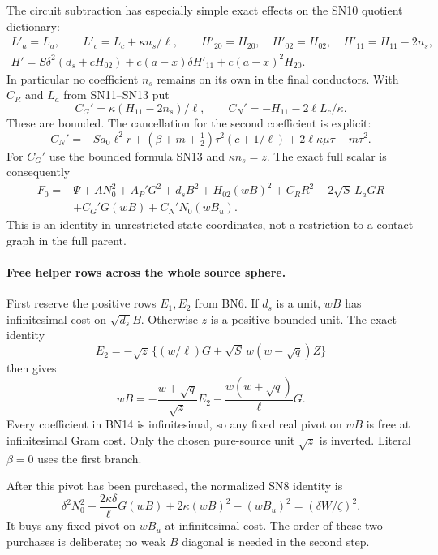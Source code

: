 The circuit subtraction has especially simple exact effects on the
SN10 quotient dictionary:
\[
\begin{gathered}
 L'_a=L_a,\qquad L'_c=L_c+\kappa n_s/\ell,\qquad
 H'_{20}=H_{20},\quad H'_{02}=H_{02},\quad
 H'_{11}=H_{11}-2n_s,\\
 H'=S\delta^2(d_s+cH_{02})
               +c(a-x)\delta H'_{11}+c(a-x)^2H_{20}.
\end{gathered}\tag{BN10}
\]
In particular no coefficient $n_s$ remains on its own in the final
conductors. With $C_R$ and $L_a$ from SN11--SN13 put
\[
 C_G'=\kappa(H_{11}-2n_s)/\ell,\qquad
 C_N'=-H_{11}-2\ell L_c/\kappa.
 \tag{BN11}
\]
These are bounded. The cancellation for the second coefficient is
explicit:
\[
 C_N'=-Sa_0\ell^2r+(\beta+m+\tfrac12)\tau^2(c+1/\ell)
                 +2\ell\kappa\mu\tau-m\tau^2.
 \tag{BN12}
\]
For $C_G'$ use the bounded formula SN13 and $\kappa n_s=z$.
The exact full scalar is consequently
\[
\begin{split}
 F_0={}&\Psi+A N_0^2+A_P'G^2+d_sB^2+H_{02}(wB)^2
       +C_RR^2-2\sqrt S\,L_aGR\\
 &+C_G'G(wB)+C_N'N_0(wB_u).
\end{split}\tag{BN13}
\]
This is an identity in unrestricted state coordinates, not a
restriction to a contact graph in the full parent.

\paragraph{Free helper rows across the whole source sphere.}
First reserve the positive rows $E_1,E_2$ from BN6. If $d_s$ is a
unit, $wB$ has infinitesimal cost on $\sqrt{d_s}B$. Otherwise
$z$ is a positive bounded unit. The exact identity
\[
 E_2=-\sqrt z\,\{(w/\ell)G+
                          \sqrt S\,w(w-\sqrt q)Z\}
\]
then gives
\[
 wB=-\frac{w+\sqrt q}{\sqrt z}E_2
                   -\frac{w(w+\sqrt q)}\ell G.
 \tag{BN14}
\]
Every coefficient in BN14 is infinitesimal, so any fixed real pivot
on $wB$ is free at infinitesimal Gram cost. Only the chosen pure-source
unit $\sqrt z$ is inverted. Literal $\beta=0$ uses the first branch.

After this pivot has been purchased, the normalized SN8 identity is
\[
 \delta^2N_0^2+\frac{2\kappa\delta}{\ell}G(wB)
          +2\kappa(wB)^2-(wB_u)^2
                         =(\delta W/\zeta)^2.
 \tag{BN15}
\]
It buys any fixed pivot on $wB_u$ at infinitesimal cost. The order of
these two purchases is deliberate; no weak $B$ diagonal is needed
in the second step.

